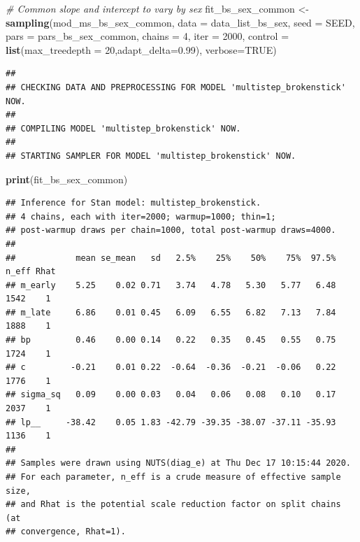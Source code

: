\documentclass[
]{article}
\newenvironment{Shaded}{\begin{snugshade}}{\end{snugshade}}
\newcommand{\CommentTok}[1]{\textcolor[rgb]{0.56,0.35,0.01}{\textit{#1}}}
\newcommand{\DataTypeTok}[1]{\textcolor[rgb]{0.13,0.29,0.53}{#1}}
\newcommand{\DecValTok}[1]{\textcolor[rgb]{0.00,0.00,0.81}{#1}}
\newcommand{\FloatTok}[1]{\textcolor[rgb]{0.00,0.00,0.81}{#1}}
\newcommand{\KeywordTok}[1]{\textcolor[rgb]{0.13,0.29,0.53}{\textbf{#1}}}
\newcommand{\NormalTok}[1]{#1}
\newcommand{\OtherTok}[1]{\textcolor[rgb]{0.56,0.35,0.01}{#1}}
\newcommand{\StringTok}[1]{\textcolor[rgb]{0.31,0.60,0.02}{#1}}
\begin{document}
\begin{Shaded}
\begin{Highlighting}[]
\CommentTok{# Common slope and intercept to vary by sex}
\NormalTok{fit_bs_sex_common <-}\StringTok{ }\KeywordTok{sampling}\NormalTok{(mod_ms_bs_sex_common, }\DataTypeTok{data =}\NormalTok{ data_list_bs_sex, }
                  \DataTypeTok{seed =}\NormalTok{ SEED,}
                  \DataTypeTok{pars =}\NormalTok{ pars_bs_sex_common, }\DataTypeTok{chains =} \DecValTok{4}\NormalTok{, }\DataTypeTok{iter =} \DecValTok{2000}\NormalTok{,}
                  \DataTypeTok{control =} \KeywordTok{list}\NormalTok{(}\DataTypeTok{max_treedepth =} \DecValTok{20}\NormalTok{,}\DataTypeTok{adapt_delta=}\FloatTok{0.99}\NormalTok{),}
                  \DataTypeTok{verbose=}\OtherTok{TRUE}\NormalTok{)}
\end{Highlighting}
\end{Shaded}

\begin{verbatim}
## 
## CHECKING DATA AND PREPROCESSING FOR MODEL 'multistep_brokenstick' NOW.
## 
## COMPILING MODEL 'multistep_brokenstick' NOW.
## 
## STARTING SAMPLER FOR MODEL 'multistep_brokenstick' NOW.
\end{verbatim}

\begin{Shaded}
\begin{Highlighting}[]
\KeywordTok{print}\NormalTok{(fit_bs_sex_common)}
\end{Highlighting}
\end{Shaded}

\begin{verbatim}
## Inference for Stan model: multistep_brokenstick.
## 4 chains, each with iter=2000; warmup=1000; thin=1; 
## post-warmup draws per chain=1000, total post-warmup draws=4000.
## 
##            mean se_mean   sd   2.5%    25%    50%    75%  97.5% n_eff Rhat
## m_early    5.25    0.02 0.71   3.74   4.78   5.30   5.77   6.48  1542    1
## m_late     6.86    0.01 0.45   6.09   6.55   6.82   7.13   7.84  1888    1
## bp         0.46    0.00 0.14   0.22   0.35   0.45   0.55   0.75  1724    1
## c         -0.21    0.01 0.22  -0.64  -0.36  -0.21  -0.06   0.22  1776    1
## sigma_sq   0.09    0.00 0.03   0.04   0.06   0.08   0.10   0.17  2037    1
## lp__     -38.42    0.05 1.83 -42.79 -39.35 -38.07 -37.11 -35.93  1136    1
## 
## Samples were drawn using NUTS(diag_e) at Thu Dec 17 10:15:44 2020.
## For each parameter, n_eff is a crude measure of effective sample size,
## and Rhat is the potential scale reduction factor on split chains (at 
## convergence, Rhat=1).
\end{verbatim}
\end{document}
